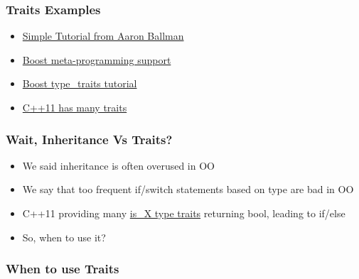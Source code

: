 \subsubsection{Traits Examples}\label{traits-examples}

\begin{itemize}
\itemsep1pt\parskip0pt
\item
  \href{http://blog.aaronballman.com/2011/11/a-simple-introduction-to-type-traits}{Simple
  Tutorial from Aaron Ballman}
\item
  \href{http://www.boost.org/doc/libs/?view=category_Metaprogramming}{Boost
  meta-programming support}
\item
  \href{http://www.boost.org/doc/libs/1_57_0/libs/type_traits/doc/html/boost_typetraits/background.html}{Boost
  type\_traits tutorial}
\item
  \href{http://www.cplusplus.com/reference/type_traits}{C++11 has many
  traits}
\end{itemize}

\subsubsection{Wait, Inheritance Vs
Traits?}\label{wait-inheritance-vs-traits}

\begin{itemize}
\itemsep1pt\parskip0pt
\item
  We said inheritance is often overused in OO
\item
  We say that too frequent if/switch statements based on type are bad in
  OO
\item
  C++11 providing many
  \href{http://www.cplusplus.com/reference/type_traits}{is\_X type
  traits} returning bool, leading to if/else
\item
  So, when to use it?
\end{itemize}

\subsubsection{When to use Traits}\label{when-to-use-traits}

